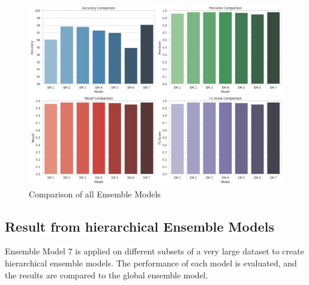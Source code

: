 \begin{figure}[h!]  
    \centering
    \includegraphics[width=1.0\textwidth]{Images/EM COMPARE.png}  
    \caption*{Comparison of all Ensemble Models}
    \label{lstm arch}  %
\end{figure}



\subsection{Result from hierarchical Ensemble Models}

\noindent
Ensemble Model 7 is applied on different subsets of a very large dataset to create hierarchical ensemble models. The performance of each model is evaluated, and the results are compared to the global ensemble model. 

